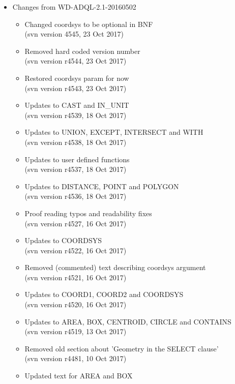 \documentclass[11pt,a4paper]{ivoa}
\begin{document}
\begin{itemize}
    \item Changes from WD-ADQL-2.1-20160502
        \begin{itemize}
            \item Changed coordsys to be optional in BNF\\
            (svn version 4545, 23 Oct 2017)
            \item Removed hard coded version number\\
            (svn version r4544, 23 Oct 2017)
            \item Restored coordsys param for now\\
            (svn version r4543, 23 Oct 2017)
            \item Updates to CAST and IN\_UNIT\\
            (svn version r4539, 18 Oct 2017)
            \item Updates to UNION, EXCEPT, INTERSECT and WITH\\
            (svn version r4538, 18 Oct 2017)
            \item Updates to user defined functions\\
            (svn version r4537, 18 Oct 2017)
            \item Updates to DISTANCE, POINT and POLYGON\\
            (svn version r4536, 18 Oct 2017)
            \item Proof reading typos and readability fixes\\
            (svn version r4527, 16 Oct 2017)
            \item Updates to COORDSYS\\
            (svn version r4522, 16 Oct 2017)
            \item Removed (commented) text describing coordsys argument\\
            (svn version r4521, 16 Oct 2017)
            \item Updates to COORD1, COORD2 and COORDSYS\\
            (svn version r4520, 16 Oct 2017)
            \item Updates to AREA, BOX, CENTROID, CIRCLE and CONTAINS\\
            (svn version r4519, 13 Oct 2017)
            \item Removed old section about 'Geometry in the SELECT clause'\\
            (svn version r4481, 10 Oct 2017)
            \item Updated text for AREA and BOX\\

\end{itemize}
\end{itemize}
\end{document}

